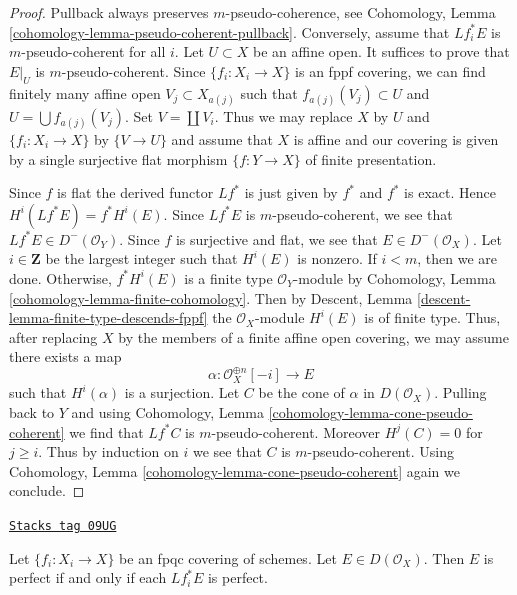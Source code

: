 \begin{proof}
Pullback always preserves $m$-pseudo-coherence, see
Cohomology, Lemma \ref{cohomology-lemma-pseudo-coherent-pullback}.
Conversely, assume that $Lf_i^*E$ is $m$-pseudo-coherent for all $i$.
Let $U \subset X$ be an affine open. It suffices to prove that
$E|_U$ is $m$-pseudo-coherent. Since $\{f_i : X_i \to X\}$ is an
fppf covering, we can find finitely many affine open $V_j \subset X_{a(j)}$
such that $f_{a(j)}(V_j) \subset U$ and $U = \bigcup f_{a(j)}(V_j)$.
Set $V = \coprod V_i$.
Thus we may replace $X$ by $U$ and $\{f_i : X_i \to X\}$ by
$\{V \to U\}$ and assume that $X$ is affine and our covering
is given by a single surjective flat morphism $\{f : Y \to X\}$
of finite presentation.

\medskip\noindent
Since $f$ is flat the derived functor $Lf^*$ is just given by $f^*$ and $f^*$
is exact. Hence $H^i(Lf^*E) = f^*H^i(E)$. Since $Lf^*E$ is $m$-pseudo-coherent,
we see that $Lf^*E \in D^-(\mathcal{O}_Y)$. Since $f$ is surjective and flat,
we see that $E \in D^-(\mathcal{O}_X)$. Let $i \in \mathbf{Z}$ be the largest
integer such that $H^i(E)$ is nonzero. If $i < m$, then we are done. Otherwise,
$f^*H^i(E)$ is a finite type $\mathcal{O}_Y$-module by
Cohomology, Lemma \ref{cohomology-lemma-finite-cohomology}.
Then by Descent, Lemma \ref{descent-lemma-finite-type-descends-fppf}
the $\mathcal{O}_X$-module $H^i(E)$ is of finite type.
Thus, after replacing $X$ by the members of a finite affine open covering,
we may assume there exists a map
$$
\alpha : \mathcal{O}_X^{\oplus n}[-i] \longrightarrow E
$$
such that $H^i(\alpha)$ is a surjection. Let $C$ be the cone of $\alpha$
in $D(\mathcal{O}_X)$. Pulling back to $Y$ and using
Cohomology, Lemma \ref{cohomology-lemma-cone-pseudo-coherent}
we find that $Lf^*C$ is $m$-pseudo-coherent. Moreover $H^j(C) = 0$
for $j \geq i$. Thus by induction on $i$ we see that $C$ is
$m$-pseudo-coherent. Using
Cohomology, Lemma \ref{cohomology-lemma-cone-pseudo-coherent}
again we conclude.
\end{proof}

\begin{lemma}
\label{perfect-lemma-perfect-descends-fpqc}
\href{https://stacks.math.columbia.edu/tag/09UG}{\texttt{Stacks tag 09UG}}

Let $\{f_i : X_i \to X\}$ be an fpqc covering of schemes. Let
$E \in D(\mathcal{O}_X)$. Then $E$ is perfect
if and only if each $Lf_i^*E$ is perfect.
\end{lemma}

